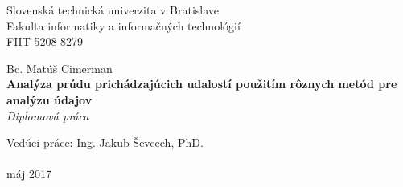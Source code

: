 \documentclass[12pt, a4paper, titlepage, slovak]{book}
\begin{document}
\sloppy %




\frontmatter

\begin{titlepage}
\begin{center}                                                                                                                                                   
{\Large Slovenská technická univerzita v Bratislave} \\
{\Large Fakulta informatiky a informačných technológií} \\
\vspace*{1\baselineskip}
\large {FIIT-5208-8279}
\vfill %


{{Bc. Matúš Cimerman}} \\
\vspace*{1\baselineskip}
{\LARGE {\textbf{Analýza prúdu prichádzajúcich udalostí použitím rôznych metód pre analýzu údajov}}} %
\\
\vspace*{1\baselineskip}
\textit{Diplomová práca}\\
\vfill %
\end{center}
{Vedúci práce: Ing. Jakub Ševcech, PhD.}\\
\\
{máj 2017}
\end{titlepage}
\emptydoublepage
\end{document}

